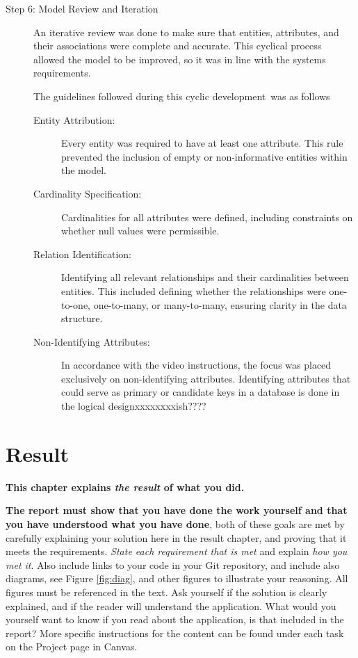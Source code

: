 \documentclass[a4paper]{scrartcl}
\begin{document}
\begin{description}
\item[Step 6: Model Review and Iteration]
  An iterative review was done to make sure that entities, attributes, and their
  associations were complete and accurate. This cyclical process allowed the
  model to be improved, so it was in line with the systems requirements.
  
  The guidelines followed during this cyclic development was as follows
  \begin{description}
    \item[Entity Attribution:]
    Every entity was required to have at least one attribute. This rule
    prevented the inclusion of empty or non-informative entities within the
    model.

    \item[Cardinality Specification:]
    Cardinalities for all attributes were defined, including constraints on
    whether null values were permissible. 

    \item[Relation Identification:]
    Identifying all relevant relationships and their cardinalities between
    entities. This included defining whether the relationships were one-to-one,
    one-to-many, or many-to-many, ensuring clarity in the data structure.

    \item[Non-Identifying Attributes:]
    In accordance with the video instructions, the focus was placed exclusively
    on non-identifying attributes. Identifying attributes that could serve as
    primary or candidate keys in a database is done in the logical
    designxxxxxxxxish????
  \end{description}
\end{description}

\section{Result}

\textbf{This chapter explains \textit{the result} of what you did.}

\textbf{The report must show that you have done the work yourself and that you have understood what you have done}, both of these goals are met by carefully explaining your solution here in the result chapter, and proving that it meets the requirements. \textit{State each requirement that is met} and explain \textit{how you met it}. Also include links to your code in your Git repository, and include also diagrams, see Figure \ref{fig:diag}, and other figures to illustrate your reasoning. All figures must be referenced in the text. Ask yourself if the solution is clearly explained, and if the reader will understand the application. What would you yourself want to know if you read about the application, is that included in the report? More specific instructions for the content can be found under each task on the Project page in Canvas. 
\end{document}
